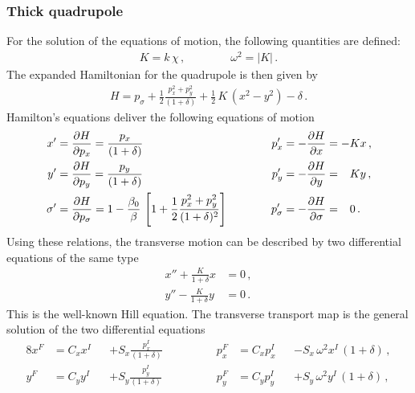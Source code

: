 \subsubsection{Thick quadrupole}
%
For the solution of the equations of motion, the following quantities are defined:
\begin{align}
K = k \, \chi \, ,\quad \quad \quad \quad  \omega^2 = |K| \, .
\end{align}
%
The expanded Hamiltonian for the quadrupole is then given by
\begin{align}
H = p_\sigma + \frac{1}{2} \frac{p_x^2+p_y^2}{(1+\delta)} + \frac{1}{2} \, K \, (x^2 -y^2) -\delta \, . \label{eq:quad_exp_H}
\end{align}
Hamilton's equations deliver the following equations of motion
%
\begin{alignat}{4}
x'      &= \frac{\partial H}{\partial p_x} = \frac{p_x}{(1+\delta)} \quad \quad \quad &p_x' &= - \frac{\partial H}{\partial x} = - K x \, ,  \\
y'      &= \frac{\partial H}{\partial p_y} = \frac{p_y}{(1+\delta)} \quad \quad \quad &p_y' &= - \frac{\partial H}{\partial y} = \phantom{-} K y \, , \\
\sigma' &= \frac{\partial H}{\partial p_\sigma} = 1- \frac{\beta_0}{\beta} \, \left[ 1 + \frac{1}{2} \frac{p_x^2 + p_y^2}{(1+\delta)^2}  \right] \quad \quad \quad &p_\sigma' &= - \frac{\partial H}{\partial \sigma} =  \phantom{-}  0 \, .
\end{alignat}
Using these relations, the transverse motion can be described by two differential equations of the same type
\begin{align}
x'' + \frac{K}{1+\delta} x &= 0 \, , \label{eq:quadeq1} \\
y'' - \frac{K}{1+\delta} y &= 0 \, .
\end{align}
%
This is the well-known Hill equation. The transverse transport map is the general solution of the two differential equations 
\begin{alignat}{8}
x^F &= C_x x^I &&+ S_x \frac{p_x^I}{(1+\delta)} \quad \quad \quad \quad &p_x^F &= C_x p_x^I &&-  S_x \, \omega^2 x^I \, (1+\delta) \, , \\ 
y^F &= C_y y^I &&+ S_y \frac{p_y^I}{(1+\delta)} \, &p_y^F &= C_y p_y^I &&+  S_y \, \omega^2 y^I  \, (1+\delta) \, ,  %
\end{alignat}
